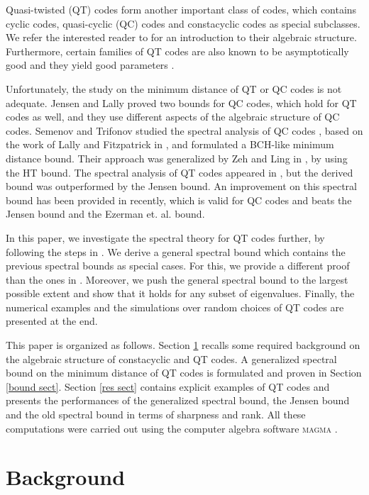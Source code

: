 \documentclass[11pt]{amsart}
\theoremstyle{plain}
\theoremstyle{definition}
\numberwithin{equation}{section}
\begin{document}
Quasi-twisted (QT) codes form another important class of codes, which contains cyclic codes, quasi-cyclic (QC) codes and constacyclic codes as special subclasses. We refer the interested reader to \cite{Y,SZ} for an introduction to their algebraic structure. Furthermore, certain families of QT codes are also known to be asymptotically good \cite{C,DH,WS} and they yield good parameters \cite{AGOSS1,AGOSS2,QSS,SQS}.

Unfortunately, the study on the minimum distance of QT or QC codes is not adequate. Jensen \cite{J} and Lally \cite{L2} proved two bounds for QC codes, which hold for QT codes as well, and they use different aspects of the algebraic structure of QC codes. Semenov and Trifonov studied the spectral analysis of QC codes \cite{ST}, based on the work of Lally and Fitzpatrick in \cite{LF}, and formulated a BCH-like minimum distance bound. Their approach was generalized by Zeh and Ling in \cite{LZ}, by using the HT bound. The spectral analysis of QT codes appeared in \cite{ELLOT}, but the derived bound was outperformed by the Jensen bound. An improvement on this spectral bound has been provided in \cite{LELO} recently, which is valid for QC codes and beats the Jensen bound and the Ezerman et. al. bound.

In this paper, we investigate the spectral theory for QT codes further, by following the steps in \cite{ELLOT,LELO}. We derive a general spectral bound which contains the previous spectral bounds as special cases. For this, we provide a different proof than the ones in \cite{ELLOT,LELO}. Moreover, we push the general spectral bound to the largest possible extent and show that it holds for any subset of eigenvalues. Finally, the numerical examples and the simulations over random choices of QT codes are presented at the end.

This paper is organized as follows. Section \ref{basics} recalls some required background on the algebraic structure of constacyclic and QT codes. A generalized spectral bound on the minimum distance of QT codes is formulated and proven in Section \ref{bound sect}. Section \ref{res sect} contains explicit examples of QT codes and presents the performances of the generalized spectral bound, the Jensen bound and the old spectral bound in terms of sharpness and rank. All these computations were carried out using the computer algebra software \textsc{magma} \cite{BCP}.
 
\section{Background}\label{basics}
\end{document}
